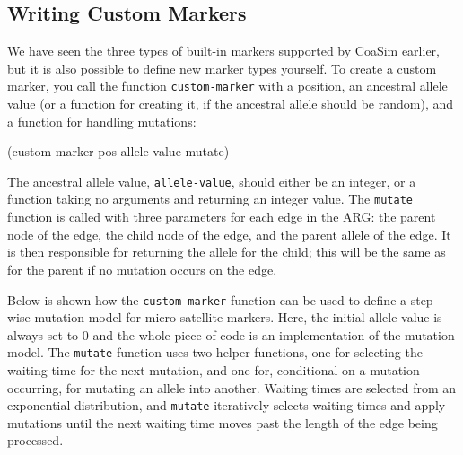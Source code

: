 \documentclass{manual}
\begin{document}
\subsection{Writing Custom Markers}
\label{sec:writ-cust-mark}

We have seen the three types of built-in markers supported by CoaSim
earlier, but it is also possible to define new marker types yourself.
To create a custom marker, you call the function
\texttt{custom-marker} with a position, an ancestral allele value (or
a function for creating it, if the ancestral allele should be random),
and a function for handling mutations:
\begin{code}
(custom-marker pos allele-value mutate)
\end{code}
The ancestral allele value, \texttt{allele-value}, should either be an
integer, or a function taking no arguments and returning an integer
value.  The \texttt{mutate} function is called with three parameters
for each edge in the ARG: the parent node of the edge, the child node
of the edge, and the parent allele of the edge.  It is then responsible
for returning the allele for the child; this will be the same as for
the parent if no mutation occurs on the edge.

Below is shown how the \texttt{custom-marker} function can be used to
define a step-wise mutation model for micro-satellite markers.  Here,
the initial allele value is always set to 0 and the whole piece of
code is an implementation of the mutation model.  The \texttt{mutate}
function uses two helper functions, one for selecting the waiting time
for the next mutation, and one for, conditional on a mutation
occurring, for mutating an allele into another.  Waiting times are
selected from an exponential distribution, and \texttt{mutate}
iteratively selects waiting times and apply mutations until the next
waiting time moves past the length of the edge being processed.
\end{document}

